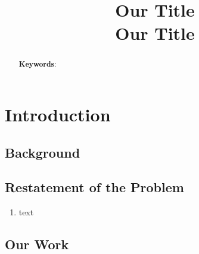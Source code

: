 \documentclass[12pt]{article}  %
\title{\huge{\textbf{{\sc Our Title}}}\\ Our Title}  %
\begin{document}
\begin{abstract}

    \vspace{5pt}
    \textbf{Keywords}:

\end{abstract}

\maketitle 
\tableofcontents
\section{Introduction}
\subsection{Background}

\subsection{Restatement of the Problem}
\begin{enumerate}
\item text
\end{enumerate}
\subsection{Our Work}
{\LARGE\CheckedBox} 
\end{document}
